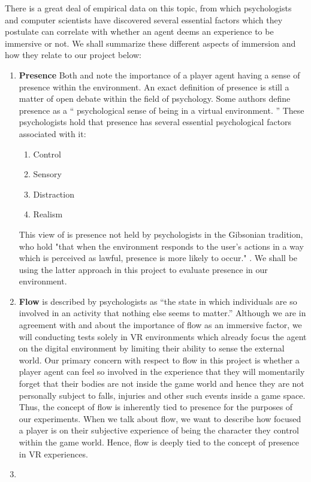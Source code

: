 There is a great deal of empirical data on this topic, from which psychologists and computer scientists have discovered several essential factors which they postulate can correlate with whether an agent deems an experience to be immersive or not. We shall summarize these different aspects of immersion and how they relate to our project below: \begin{enumerate}
	\item \textbf{Presence} Both \cite{Cheng:2005:BRI:1056808.1056894} and \cite{Brown04agrounded} note the importance of a player agent having a sense of presence within the environment.  An exact definition of presence is still a matter of open debate within the field of psychology. Some authors define presence as a  ``
	psychological sense of being in a virtual environment. ''  \cite{Slater_1994}
	These psychologists hold that presence has several essential psychological factors associated with it: \begin{enumerate}
		\item Control
		\item Sensory
		\item Distraction
		\item Realism
	\end{enumerate}
This view of is presence not held by psychologists in the Gibsonian tradition, who hold "that when the environment
responds to the user's actions in a way which is perceived
as lawful, presence is more likely to occur." \cite{Zahorik98presenceas}. We shall be using the latter approach in this project to evaluate presence in our environment.
	\item \textbf{Flow} is described by psychologists as ``the state in which individuals are so involved
in an activity that nothing else seems to matter.''  \cite{csikszentmihalyi1990flow} Although we are in agreement with \cite{Brown04agrounded} and \cite{Cheng:2005:BRI:1056808.1056894} about the importance of flow as an immersive factor, we will conducting tests solely in VR environments which already focus the agent on the digital environment by limiting their ability to sense the external world. Our primary concern with respect to flow in this project is whether a player agent can feel so involved in the experience that they will momentarily forget that their bodies are not inside the game world and hence they are not personally subject to falls, injuries and other such events inside a game space. Thus, the concept of flow is inherently tied to presence for the purposes of our experiments. When we talk about flow, we want to describe how focused a player is on their subjective experience of being the character they control within the game world. Hence, flow is deeply tied to the concept of presence in VR experiences. 
\item
\end{enumerate}
